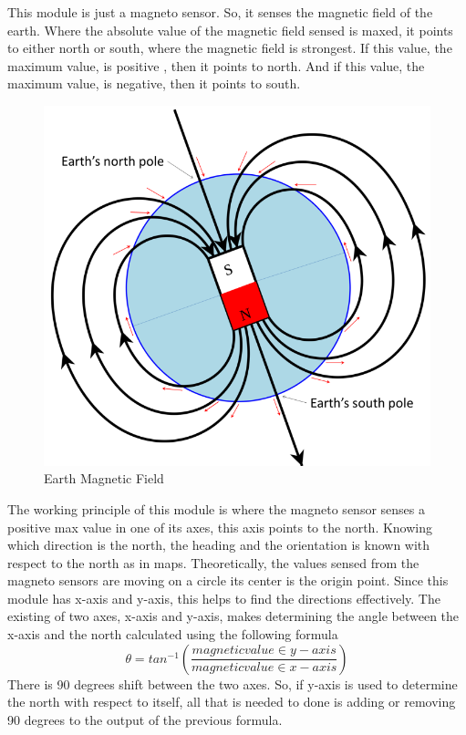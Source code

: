 This module is just a magneto sensor. So, it senses the magnetic field of the earth. Where the absolute value of the magnetic field sensed is maxed, it points to either north or south, where the magnetic field is strongest. If this value, the maximum value, is positive , then it points to north. And if this value, the maximum value, is negative, then it points to south.
\clearpage
\begin{figure}[h]
    \centering
    \includegraphics[scale=.3]{figures/3.png}
    \caption{Earth Magnetic Field}
\end{figure}
The working principle of this module is where the magneto sensor senses a positive max value in one of its axes, this axis points to the north. Knowing which direction is the north, the heading and the orientation is known with respect to the north as in maps.
Theoretically, the values sensed from the magneto sensors are moving on a circle its center is the origin point.
Since this module has x-axis and y-axis, this helps to find the directions effectively.
The existing of two axes, x-axis and y-axis, makes determining the angle between the x-axis and the north calculated using the following formula
\[ \theta = tan ^{-1} (\frac{magnetic value \in y-axis}{magnetic value \in x-axis})\]
There is 90 degrees shift between the two axes. So, if y-axis is used to determine the north with respect to itself, all that is needed to done is adding or removing 90 degrees to the output of the previous formula.

